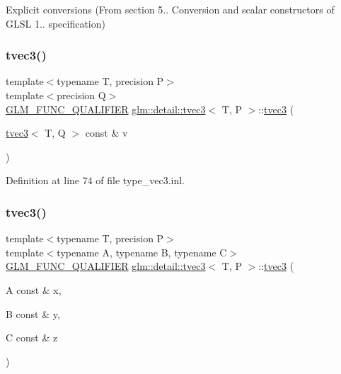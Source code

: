 Explicit conversions (From section 5.. Conversion and scalar constructors of G\+L\+SL 1.. specification) 

\mbox{\label{structglm_1_1detail_1_1tvec3_a24728ecfb1a04a02cf53f27e4a536395}} 
\subsubsection{\texorpdfstring{tvec3()}{tvec3()}\hspace{0.1cm}{\footnotesize\ttfamily [12/17]}}
{\footnotesize\ttfamily template$<$typename T, precision P$>$ \\
template$<$precision Q$>$ \\
\hyperlink{setup_8hpp_a33fdea6f91c5f834105f7415e2a64407}{G\+L\+M\+\_\+\+F\+U\+N\+C\+\_\+\+Q\+U\+A\+L\+I\+F\+I\+ER} \hyperlink{structglm_1_1detail_1_1tvec3}{glm\+::detail\+::tvec3}$<$ T, P $>$\+::\hyperlink{structglm_1_1detail_1_1tvec3}{tvec3} (\begin{DoxyParamCaption}\item[{\hyperlink{structglm_1_1detail_1_1tvec3}{tvec3}$<$ T, Q $>$ const \&}]{v }\end{DoxyParamCaption})}



Definition at line 74 of file type\+\_\+vec3.\+inl.

\mbox{\label{structglm_1_1detail_1_1tvec3_a3180ac888680910e3b6c42d77ab8c299}} 
\subsubsection{\texorpdfstring{tvec3()}{tvec3()}\hspace{0.1cm}{\footnotesize\ttfamily [13/17]}}
{\footnotesize\ttfamily template$<$typename T, precision P$>$ \\
template$<$typename A, typename B, typename C$>$ \\
\hyperlink{setup_8hpp_a33fdea6f91c5f834105f7415e2a64407}{G\+L\+M\+\_\+\+F\+U\+N\+C\+\_\+\+Q\+U\+A\+L\+I\+F\+I\+ER} \hyperlink{structglm_1_1detail_1_1tvec3}{glm\+::detail\+::tvec3}$<$ T, P $>$\+::\hyperlink{structglm_1_1detail_1_1tvec3}{tvec3} (\begin{DoxyParamCaption}\item[{A const \&}]{x,  }\item[{B const \&}]{y,  }\item[{C const \&}]{z }\end{DoxyParamCaption})}



